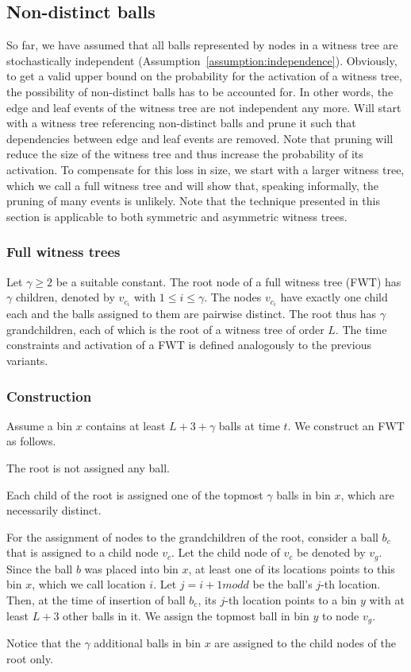 \documentclass[a4paper,12pt]{article}
\begin{document}
\subsection{Non-distinct balls}
\label{sec:analysis:nondistinctBalls}
So far, we have assumed that all balls represented by nodes in a witness tree are stochastically independent (Assumption~\ref{assumption:independence}). Obviously, to get a valid upper bound on the probability for the activation of a witness tree, the possibility of non-distinct balls has to be accounted for. In other words, the edge and leaf events of the witness tree are not independent any more. Will start with a witness tree referencing non-distinct balls and prune it such that dependencies between edge and leaf events are removed. Note that pruning will reduce the size of the witness tree and thus increase the probability of its activation. To compensate for this loss in size, we start with a larger witness tree, which we call a full witness tree and will show that, speaking informally, the pruning of many events is unlikely. Note that the technique presented in this section is applicable to both symmetric and asymmetric witness trees. 

\subsubsection{Full witness trees}
\label{sec:analysis:FullWT}
Let $\gamma \geq 2$ be a suitable constant. The root node of a full witness tree (FWT) has $\gamma$ children, denoted by $v_{c_i}$ with $1\leq i \leq \gamma$. The nodes $v_{c_i}$ have exactly one child each and the balls assigned to them are pairwise distinct. The root thus has $\gamma$ grandchildren, each of which is the root of a witness tree of order $L$. The time constraints and activation of a FWT is defined analogously to the previous variants.

\subsubsection{Construction}
\label{sec:analysis:constructionFullWT}
Assume a bin $x$ contains at least $L+3+\gamma$ balls at time $t$. We construct an FWT as follows.
\begin{compactitem}
\item The root is not assigned any ball.
\item Each child of the root is assigned one of the topmost $\gamma$ balls in bin $x$, which are necessarily distinct.
\item For the assignment of nodes to the grandchildren of the root, consider a ball $b_c$ that is assigned to a child node $v_c$. Let the child node of $v_c$ be denoted by $v_g$. Since the ball $b$ was placed into bin $x$, at least one of its locations points to this bin $x$, which we call location $i$. Let $j = i+1 mod d$ be the ball's $j$-th location. Then, at the time of insertion of ball $b_c$, its $j$-th location points to a bin $y$ with at least $L+3$ other balls in it. We assign the topmost ball in bin $y$ to node $v_g$.
\end{compactitem}
Notice that the $\gamma$ additional balls in bin $x$ are assigned to the child nodes of the root only. 
\end{document}
